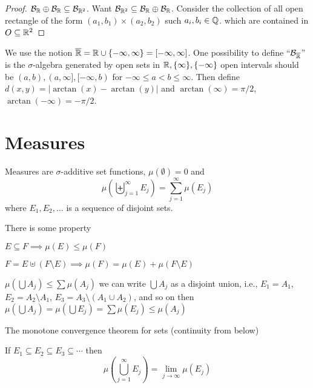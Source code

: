 \begin{proof}
  $\mathcal B_\mathbb R \oplus \mathcal B_\mathbb R \subseteq \mathcal B_{\mathbb R^2}$. Want $\mathcal B_{\mathbb R^2} \subseteq \mathcal B_\mathbb R \oplus \mathcal B_\mathbb R$.
  Consider the collection of all open rectangle of the form $(a_1, b_1) \times (a_2, b_2)$ such $a_i, b_i \in \mathbb Q$.
  which are contained in $O \subseteq \mathbb R^2$
\end{proof}

\begin{definition}
We use the notion $\overline{\mathbb R} = \mathbb R \cup \{-\infty, \infty\} = [-\infty, \infty]$.
One possibility to define ``$\mathcal B_{\overline{\mathbb R}}$'' is the $\sigma$-algebra generated by open sets in $\mathbb R, \{\infty\}, \{-\infty\}$
open intervals should be $(a, b), (a, \infty], [-\infty, b)$ for $-\infty \leq a < b \leq \infty$. Then define $d(x, y) = |\arctan(x) - \arctan(y)|$ and 
$\arctan(\infty) = \pi/2$, $\arctan(-\infty) = -\pi/2$.
\end{definition}

\section{Measures}

\begin{definition}
Measures are $\sigma$-additive set functions, $\mu(\emptyset) = 0$ and
\[\mu\left(\biguplus_{j=1}^\infty E_j\right) = \sum_{j=1}^\infty \mu(E_j)\]
where $E_1, E_2, \dotsc$ is a sequence of disjoint sets.
\end{definition}

\begin{remark}
There is some property   

$E \subseteq F \implies \mu(E) \leq \mu(F)$ 

$F = E \uplus (F \setminus E) \implies \mu(F) = \mu(E) + \mu(F \setminus E)$

$\mu(\bigcup A_j) \leq \sum \mu(A_j)$
we can write $\bigcup A_j$ as a disjoint union, i.e.,
$E_1 = A_1$, $E_2 = A_2 \setminus A_1$, $E_3 = A_3 \setminus (A_1 \cup A_2)$, and so on then
$\mu(\bigcup A_j) = \mu(\bigcup E_j) = \sum \mu(E_j) \leq \mu(A_j)$
\end{remark}

The monotone convergence theorem for sets (continuity from below)

\begin{theorem}\label{lem:continuity-from-below}
  
If $E_1 \subseteq E_2 \subseteq E_3 \subseteq \dotsm$ then
\[\mu\left(\bigcup_{j=1}^\infty E_j\right) = \lim_{j\to\infty} \mu(E_j)\]
\end{theorem}

